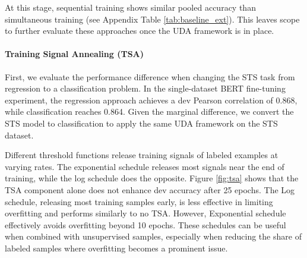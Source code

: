 \documentclass{article}
\begin{document}
At this stage, sequential training shows similar pooled accuracy than simultaneous 
training (see Appendix Table \ref{tab:baseline_ext}). This leaves scope to further 
evaluate these approaches once the UDA framework is in place.

\paragraph{Training Signal Annealing (TSA)}
First, we evaluate the performance difference when changing the STS task from regression 
to a classification problem. In the single-dataset BERT 
fine-tuning experiment, the regression approach achieves a dev Pearson correlation of 0.868, 
while classification reaches 0.864. Given the marginal difference, we convert the STS model 
to classification to apply the same UDA framework on the STS dataset.

Different threshold functions release training signals of labeled examples at varying 
rates. The exponential schedule releases most signals near the end of training, while 
the log schedule does the opposite. Figure \ref{fig:tsa} shows that the TSA component 
alone does not enhance dev accuracy after 25 epochs. The Log schedule, releasing most 
training samples early, is less effective in limiting overfitting and performs similarly 
to no TSA. However, Exponential schedule effectively avoids overfitting 
beyond 10 epochs. These schedules can be useful when combined with unsupervised samples, 
especially when reducing the share of labeled samples where overfitting becomes a 
prominent issue.
\end{document}
